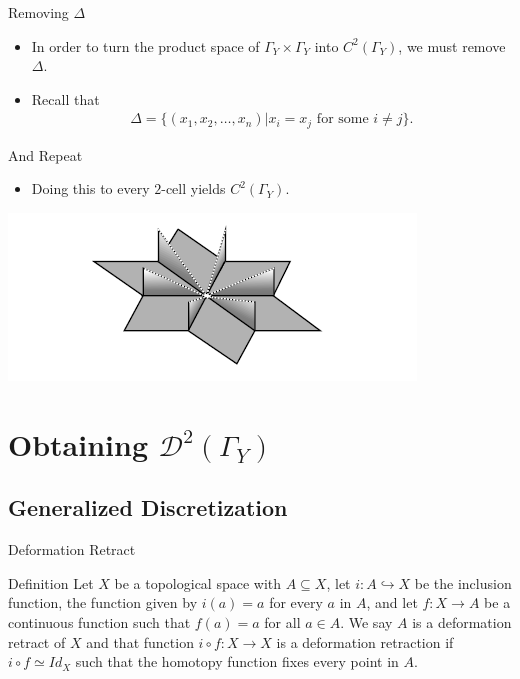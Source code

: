 \documentclass{beamer}
\newcommand{\Y}{\Gamma_Y}
\newcommand{\C}{$C^2(\Y)$}
\begin{document}
\begin{frame}{Removing $\Delta$}
\begin{itemize}
\item In order to turn the product space of $\Y \times \Y$ into \C, we must remove $\Delta$. \pause
\item Recall that 
\begin{align*}
\Delta = \{ (x_1,x_2,\dots,x_n)| x_i=x_j \text{ for some } i\neq j\}.
\end{align*}\pause
\centering
\end{itemize}
\end{frame}

\begin{frame}{And Repeat}
\begin{itemize}
\item Doing this to every $2$-cell yields \C.
\end{itemize}

\centering
\includegraphics[scale=.75]{Config.jpg}
\end{frame}

\section{Obtaining $\mathcal{D}^2(\Y)$}
\subsection{Generalized Discretization}

\begin{frame}{Deformation Retract}
\begin{block}{Definition}
Let $X$ be a topological space with $A\subseteq X$, let $i\colon A\hookrightarrow X$ be the inclusion function, the function given by $i(a)=a$ for every $a$ in $A$, and let $f\colon X\rightarrow A$ be a continuous function such that $f(a)= a$ for all $a\in A$. We say $A$ is a deformation retract of $X$ and that function $i\circ f\colon X\rightarrow X$ is a deformation retraction if $i\circ f \simeq Id_X$ such that the homotopy function fixes every point in $A$.
\end{block}
\end{frame}
\end{document}

